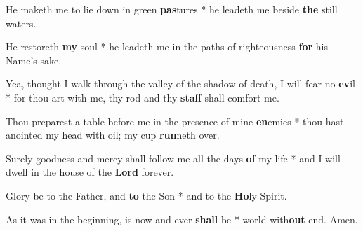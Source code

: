 \begin{multicols}{2}
	He maketh me to lie down in green \textbf{pas}tures * he leadeth me beside \textbf{the} still waters.
	
	He restoreth \textbf{my} soul * he leadeth me in the paths of righteousness \textbf{for} his Name's sake.
	
	Yea, thought I walk through the valley of the shadow of death, I will fear no \textbf{ev}il * for thou art with me, thy rod and thy \textbf{staff} shall comfort me.
	
	Thou preparest a table before me in the presence of mine \textbf{en}emies * thou hast anointed my head with oil; my cup \textbf{run}neth over.
	
	Surely goodness and mercy shall follow me all the days \textbf{of} my life * and I will dwell in the house of the \textbf{Lord} forever.
	
	Glory be to the Father, and \textbf{to} the Son * and to the \textbf{Ho}ly Spirit.
	
	As it was in the beginning, is now and ever \textbf{shall} be * world with\textbf{out} end. Amen.
\end{multicols}
